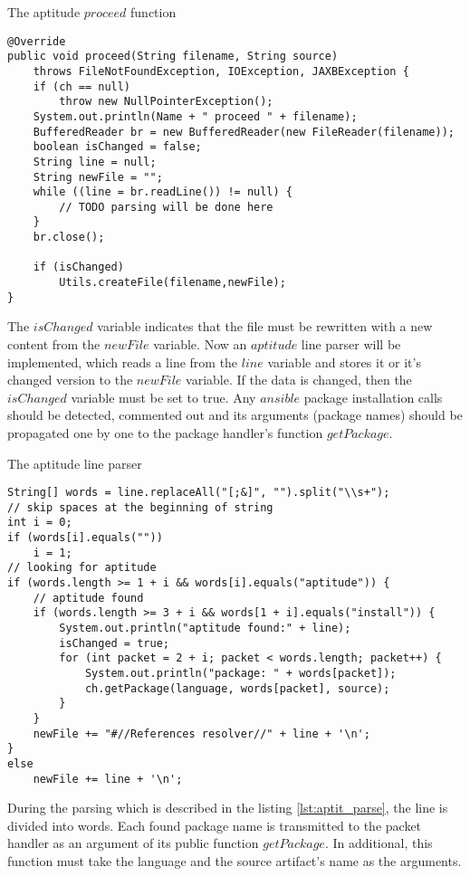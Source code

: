 \begin{Listing} 
\caption{The aptitude $proceed$ function}
\label{lst:aptit_proceed}
\begin{lstlisting}
@Override
public void proceed(String filename, String source)
	throws FileNotFoundException, IOException, JAXBException {
	if (ch == null)
		throw new NullPointerException();
	System.out.println(Name + " proceed " + filename);
	BufferedReader br = new BufferedReader(new FileReader(filename));
	boolean isChanged = false;
	String line = null;
	String newFile = "";
	while ((line = br.readLine()) != null) {
		// TODO parsing will be done here
	}
	br.close();

	if (isChanged)
		Utils.createFile(filename,newFile);
}	 
\end{lstlisting}
\end{Listing} 
The $isChanged$ variable indicates that the file must be rewritten with a new content from the $newFile$ variable.
Now an $aptitude$ line parser will be implemented, which reads a line from the $line$ variable and stores it or it's changed version to the $newFile$ variable.
If the data is changed, then the $isChanged$ variable must be set to true.
Any $ansible$ package installation calls should be detected, commented out and its arguments (package names) should be propagated one by one to the package handler's function $getPackage$.\\
\begin{Listing} 
\caption{The aptitude line parser}
\label{lst:aptit_parse}
\begin{lstlisting}
String[] words = line.replaceAll("[;&]", "").split("\\s+");
// skip spaces at the beginning of string
int i = 0;
if (words[i].equals(""))
	i = 1;
// looking for aptitude 
if (words.length >= 1 + i && words[i].equals("aptitude")) {
	// aptitude found
	if (words.length >= 3 + i && words[1 + i].equals("install")) {
		System.out.println("aptitude found:" + line);
		isChanged = true;
		for (int packet = 2 + i; packet < words.length; packet++) {
			System.out.println("package: " + words[packet]);
			ch.getPackage(language, words[packet], source);
		}
	}
	newFile += "#//References resolver//" + line + '\n';
} 
else
	newFile += line + '\n';
\end{lstlisting}
\end{Listing} 
During the parsing which is described in the listing \ref{lst:aptit_parse}, the line is divided into words. 
Each found package name is transmitted to the packet handler as an argument of its public function $getPackage$.
In additional, this function must take the language and the source artifact's name as the arguments.

